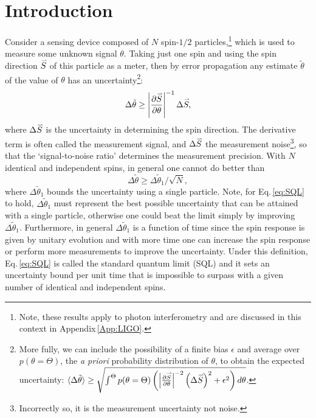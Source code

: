 \documentclass[reqno]{amsart}
\def\be{\begin{equation}}
\def\ee{\end{equation}}
\def\est#1{\tilde{#1}}
\newcommand{\myvec}[1]{\accentset{\rightharpoonup}{#1}}
\begin{document}
\section*{Introduction}
Consider a sensing device composed of $N$ spin-$1/2$ particles,\footnote{Note, these results apply to photon interferometry and are discussed in this context in Appendix\,\ref{App:LIGO}.} which is used to measure some unknown signal $\theta$. %
Taking just one spin and using the spin direction $\myvec{S}$ of this particle as a meter, then by error propagation any estimate $\est{\theta}$ of the value of $\theta$ has an uncertainty\footnote{More fully, we can include the possibility of a finite bias $\epsilon$ and average over $p(\theta = \Theta)$, the \emph{a priori} probability distribution of $\theta$, to obtain the expected uncertainty: $\langle \Delta \est{\theta}\rangle \geq \sqrt{\int^{\Theta} p(\theta = \Theta)\left( \left| \frac{\partial \myvec{S}}{\partial \theta} \right|^{-2} \left(\Delta \myvec{S}\right)^2+\epsilon^2\right) d\theta}$.}:
\be
\Delta \est{\theta} \geq \left| \frac{\partial \myvec{S}}{\partial \theta} \right|^{-1} \Delta \myvec{S}, %
\label{eq:SNR}
\ee
where $\Delta \myvec{S}$ is the uncertainty in determining the spin direction. The derivative term is often called the measurement signal, and $\Delta \myvec{S}$ %
the measurement noise\footnote{Incorrectly so, it is the measurement uncertainty not noise.}, so that the `signal-to-noise ratio' determines the measurement precision. With $N$ identical and independent spins, in general one cannot do better than
\be
\Delta \est{\theta} \geq \Delta \est{\theta}_1 / \sqrt{N}, \label{eq:SQL}
\ee
where $\Delta \est{\theta}_1$ bounds the uncertainty using a single particle. Note, for Eq.\,\eqref{eq:SQL} to hold, $\Delta \est{\theta}_1$ must represent the best possible uncertainty that can be attained with a single particle, otherwise one could beat the limit simply by improving $\Delta \est{\theta}_1$. Furthermore, in general $\Delta \est{\theta}_1$ is a function of time since the spin response is given by unitary evolution and with more time one can increase the spin response or perform more measurements to improve the uncertainty. Under this definition, Eq.\,\eqref{eq:SQL} is called the standard quantum limit (SQL) and it sets an uncertainty bound per unit time that is impossible to surpass with a given number of identical and independent spins.
\end{document}
